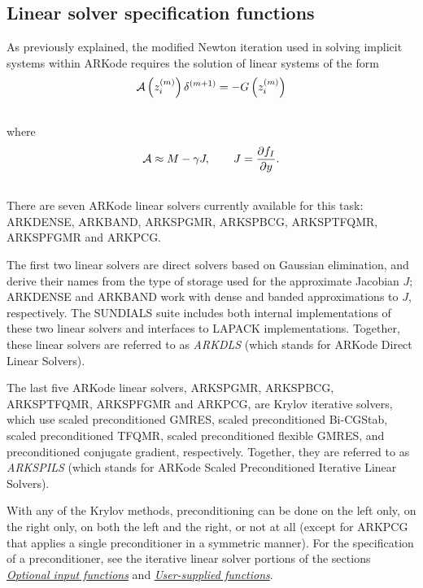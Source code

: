 \documentclass[letterpaper,10pt,english]{sphinxmanual}
\begin{document}
\subsection{Linear solver specification functions}
\label{c_interface/User_callable:cinterface-linearsolvers}\label{c_interface/User_callable:linear-solver-specification-functions}
As previously explained, the modified Newton iteration used in solving
implicit systems within ARKode requires the solution of linear
systems of the form
\begin{gather}
\begin{split}{\mathcal A}\left(z_i^{(m)}\right) \delta^{(m+1)} = -G\left(z_i^{(m)}\right)\end{split}\notag\\\begin{split}\end{split}\notag
\end{gather}
where
\begin{gather}
\begin{split}{\mathcal A} \approx M - \gamma J, \qquad J = \frac{\partial f_I}{\partial y}.\end{split}\notag\\\begin{split}\end{split}\notag
\end{gather}
There are seven ARKode linear solvers currently available for this
task: ARKDENSE, ARKBAND, ARKSPGMR, ARKSPBCG, ARKSPTFQMR, ARKSPFGMR and
ARKPCG.

The first two linear solvers are direct solvers based on Gaussian
elimination, and derive their names from the type of storage used for
the approximate Jacobian $J$; ARKDENSE and ARKBAND work with
dense and banded approximations to $J$, respectively. The
SUNDIALS suite includes both internal implementations of these two
linear solvers and interfaces to LAPACK implementations. Together,
these linear solvers are referred to as \emph{ARKDLS} (which stands for
ARKode Direct Linear Solvers).

The last five ARKode linear solvers, ARKSPGMR, ARKSPBCG, ARKSPTFQMR,
ARKSPFGMR and ARKPCG, are Krylov iterative solvers, which use scaled
preconditioned GMRES, scaled preconditioned Bi-CGStab, scaled
preconditioned TFQMR, scaled preconditioned flexible GMRES, and
preconditioned conjugate gradient, respectively.  Together, they are
referred to as \emph{ARKSPILS} (which stands for ARKode Scaled
Preconditioned Iterative Linear Solvers).

With any of the Krylov methods, preconditioning can be done on the
left only, on the right only, on both the left and the right, or not
at all (except for ARKPCG that applies a single preconditioner in a
symmetric manner). For the specification of a preconditioner, see the
iterative linear solver portions of the sections
{\hyperref[c_interface/User_callable:cinterface-optionalinputs]{\emph{Optional input functions}}} and {\hyperref[c_interface/User_supplied:cinterface-usersupplied]{\emph{User-supplied functions}}}.
\end{document}
